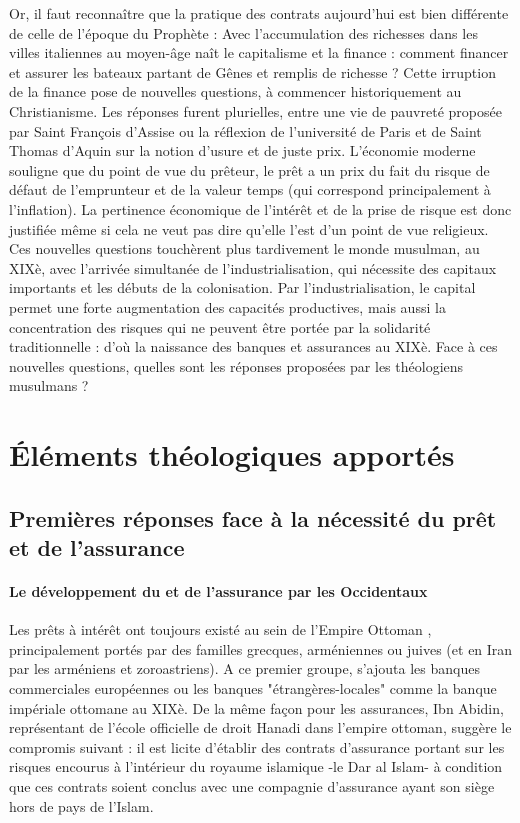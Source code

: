 Or, il faut reconnaître que la pratique des contrats aujourd'hui est bien différente de celle de l'époque du Prophète : Avec l'accumulation des richesses dans les villes italiennes au moyen-âge naît le capitalisme et la finance : comment financer et assurer les bateaux partant de Gênes et remplis de richesse ? Cette irruption de la finance pose de nouvelles questions, à commencer historiquement au Christianisme. Les réponses furent plurielles, entre une vie de pauvreté proposée par Saint François d'Assise ou la réflexion de l'université de Paris et de Saint Thomas d'Aquin sur la notion d'usure et de juste prix. 
L'économie moderne souligne que du point de vue du prêteur, le prêt a un prix du fait du risque  de défaut de l'emprunteur et de la valeur temps (qui correspond principalement à l'inflation). La pertinence économique de l'intérêt et de la prise de risque est donc justifiée même si cela ne veut pas dire qu'elle l'est d'un point de vue religieux.
Ces nouvelles questions touchèrent plus tardivement le monde musulman, au XIXè, avec l'arrivée simultanée de l'industrialisation, qui nécessite des capitaux importants et les débuts de la colonisation. Par l'industrialisation, le capital permet une forte augmentation des capacités productives, mais aussi la concentration des risques qui ne peuvent être portée par la solidarité traditionnelle : d'où la naissance des banques et assurances au XIXè.
Face à ces nouvelles questions, quelles sont les réponses proposées par les théologiens musulmans ?




\section{Éléments théologiques apportés}

\subsection{Premières réponses face à la nécessité du prêt et de l'assurance}
\paragraph{Le développement du \riba et de l'assurance par les Occidentaux} Les prêts à intérêt ont toujours existé au sein de l'Empire Ottoman , principalement portés par des familles grecques, arméniennes ou juives (et en Iran par les arméniens et zoroastriens). A ce premier groupe, s'ajouta les banques commerciales européennes ou les banques "étrangères-locales" comme la banque impériale ottomane au XIXè.
De la même façon pour les assurances, Ibn Abidin, représentant de l'école officielle de droit Hanadi dans l'empire ottoman, suggère le compromis suivant : il est licite d'établir des contrats d'assurance portant sur les risques encourus à l'intérieur du royaume islamique -le Dar al Islam- à condition que ces contrats soient conclus avec une compagnie d'assurance ayant son siège hors de pays de l'Islam. 

